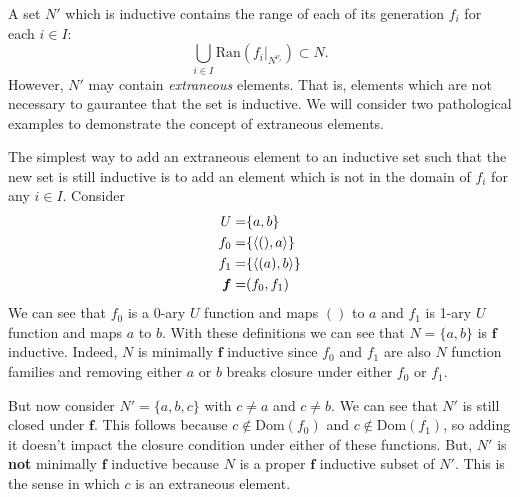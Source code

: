 \documentclass[oneside, 12pt]{book}
\theoremstyle{break}
\newtheorem{preformal definition}[definition]{Preformal Definition}
\newtheorem{preformal theorem}[theorem]{Preformal Theorem}
\newcommand{\bv}[1]{\boldsymbol{#1}}
\begin{document}
				A set $N'$ which is  inductive contains the range of each of its generation $f_i$ for each $i\in I$:
				\begin{equation*}
					\bigcup_{i\in I} \text{Ran}(f_i|_{N^{\nu_i}}) \subset N.
				\end{equation*}
				However, $N'$ may contain \textit{extraneous} elements.
				That is, elements which are not necessary to gaurantee that the set is inductive.
				We will consider two pathological examples to demonstrate the concept of extraneous elements.
				
				The simplest way to add an extraneous element to an inductive set such that the new set is still inductive is to add an element which is not in the domain of $f_i$ for any $i\in I$.
				Consider
				\begin{align*}
					U =& \{a, b\}\\
					f_0 =& \{\braket{(), a}\}\\
					f_1 =& \{\braket{(a), b}\}\\
					\bv{f} =& (f_0, f_1)
				\end{align*}
				We can see that $f_0$ is a 0-ary $U$ function and maps $()$ to $a$ and $f_1$ is 1-ary $U$ function and maps $a$ to $b$.
				With these definitions we can see that $N = \{a, b\}$ is $\bv{f}$ inductive.
				Indeed, $N$ is minimally $\bv{f}$ inductive since $f_0$ and $f_1$ are also $N$ function families and removing either $a$ or $b$ breaks closure under either $f_0$ or $f_1$.
				
				But now consider $N' = \{a, b, c\}$ with $c\neq a$ and $c \neq b$.
				We can see that $N'$ is still closed under $\bv{f}$.
				This follows because $c\not \in \text{Dom}(f_0)$ and $c\not \in \text{Dom}(f_1)$, so adding it doesn't impact the closure condition under either of these functions.
				But, $N'$ is \textbf{not} minimally $\bv{f}$ inductive because $N$ is a proper $\bv{f}$ inductive subset of $N'$.
				This is the sense in which $c$ is an extraneous element.
				
\end{document}
